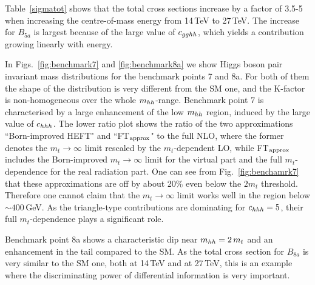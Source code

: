 %
Table~\ref{sigmatot} shows that the total cross sections increase by a factor of 3.5-5 when increasing the centre-of-mass energy from 14\,TeV to 27\,TeV. The increase for $B_{5a}$ is largest because of the large value of $c_{gghh}$, which yields a contribution growing linearly with energy.




In Figs.~\ref{fig:benchmark7} and \ref{fig:benchmark8a} we show Higgs boson pair invariant mass distributions for the benchmark points 7 and 8a. 
For both of them the shape of the distribution is very different from the SM one, and the K-factor is non-homogeneous over the whole $m_{hh}$-range. Benchmark point 7 is characterised by a large enhancement of the low $m_{hh}$ region, induced by the large value of $c_{hhh}$. The lower ratio plot shows the ratio of the two approximations ``Born-improved HEFT" and ``FT$_{\rm{approx}}$" to the full NLO, where the former denotes the $m_t\to\infty$ limit rescaled by the $m_t$-dependent LO, while FT$_{\rm{approx}}$ includes the Born-improved $m_t\to\infty$ limit for the virtual part and the full $m_t$-dependence for the real radiation part. One can see from Fig.~\ref{fig:benchamrk7} that these approximations are off by about 20\% even below the $2m_t$ threshold. Therefore one cannot claim that the $m_t\to \infty$ limit works well in the region below $\sim 400$\,GeV. As the triangle-type contributions are dominating for $c_{hhh}=5$, their full $m_t$-dependence plays a significant role. 

Benchmark point 8a shows a characteristic dip near $m_{hh}=2\,m_t$ and an enhancement in the tail compared to the SM. 
As the total cross section for $B_{8a}$ is very similar to the SM one, both at 14\,TeV and at 27\,TeV, this is an example where the discriminating power of differential information is very important.

